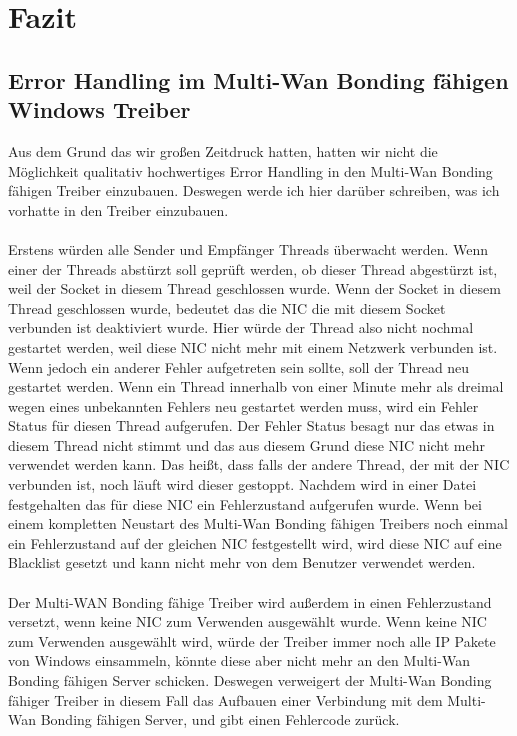 \chapter{Fazit}
\label{cha:Fazit}
\section{Error Handling im Multi-Wan Bonding fähigen Windows Treiber}
Aus dem Grund das wir großen Zeitdruck hatten, hatten wir nicht die Möglichkeit qualitativ hochwertiges Error Handling in den Multi-Wan Bonding fähigen Treiber einzubauen. Deswegen werde ich hier darüber schreiben, was ich vorhatte in den Treiber einzubauen.
\\\\
Erstens würden alle Sender und Empfänger Threads überwacht werden. Wenn einer der Threads abstürzt soll geprüft werden, ob dieser Thread abgestürzt ist, weil der Socket in diesem Thread geschlossen wurde. Wenn der Socket in diesem Thread geschlossen wurde, bedeutet das die NIC die mit diesem Socket verbunden ist deaktiviert wurde. Hier würde der Thread also nicht nochmal gestartet werden, weil diese NIC nicht mehr mit einem Netzwerk verbunden ist. Wenn jedoch ein anderer Fehler aufgetreten sein sollte, soll der Thread neu gestartet werden. Wenn ein Thread innerhalb von einer Minute mehr als dreimal wegen eines unbekannten Fehlers neu gestartet werden muss, wird ein Fehler Status für diesen Thread aufgerufen. Der Fehler Status besagt nur das etwas in diesem Thread nicht stimmt und das aus diesem Grund diese NIC nicht mehr verwendet werden kann. Das heißt, dass falls der andere Thread, der mit der NIC verbunden ist, noch läuft wird dieser gestoppt. Nachdem wird in einer Datei festgehalten das für diese NIC ein Fehlerzustand aufgerufen wurde. Wenn bei einem kompletten Neustart des Multi-Wan Bonding fähigen Treibers noch einmal ein Fehlerzustand auf der gleichen NIC festgestellt wird, wird diese NIC auf eine Blacklist gesetzt und kann nicht mehr von dem Benutzer verwendet werden.
\\\\
Der Multi-WAN Bonding fähige Treiber wird außerdem in einen Fehlerzustand versetzt, wenn keine NIC zum Verwenden ausgewählt wurde. Wenn keine NIC zum Verwenden ausgewählt wird, würde der Treiber immer noch alle IP Pakete von Windows einsammeln, könnte diese aber nicht mehr an den Multi-Wan Bonding fähigen Server schicken. Deswegen verweigert der Multi-Wan Bonding fähiger Treiber in diesem Fall das Aufbauen einer Verbindung mit dem Multi-Wan Bonding fähigen Server, und gibt einen Fehlercode zurück.